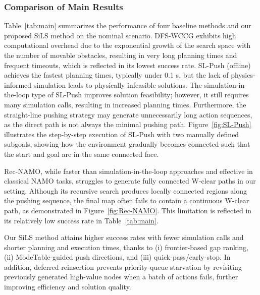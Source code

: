 \subsubsection{Comparison of Main Results}
\label{subsec:comparison}
Table~\ref{tab:main} summarizes the performance of four baseline methods and our proposed SiLS method on the nominal scenario. DFS-WCCG exhibits high computational overhead due to the exponential growth of the search space with the number of movable obstacles, resulting in very long planning times and frequent timeouts, which is reflected in its lowest success rate. SL-Push (offline) achieves the fastest planning times, typically under 0.1 s, but the lack of physics-informed simulation leads to physically infeasible solutions. The simulation-in-the-loop type of SL-Push improves solution feasibility; however, it still requires many simulation calls, resulting in increased planning times. Furthermore, the straight-line pushing strategy may generate unnecessarily long action sequences, as the direct path is not always the minimal pushing path. Figure~\ref{fig:SL-Push} illustrates the step-by-step execution of SL-Push with two manually defined subgoals, showing how the environment gradually becomes connected such that the start and goal are in the same connected face.

Rec-NAMO, while faster than simulation-in-the-loop approaches and effective in classical NAMO tasks, struggles to generate fully connected W-clear paths in our setting. Although its recursive search produces locally connected regions along the pushing sequence, the final map often fails to contain a continuous W-clear path, as demonstrated in Figure~\ref{fig:Rec-NAMO}. This limitation is reflected in its relatively low success rate in Table~\ref{tab:main}.

Our SiLS method attains higher success rates with fewer simulation calls and shorter planning and execution times, thanks to (i) frontier-based gap ranking, (ii) ModeTable-guided push directions, and (iii) quick-pass/early-stop. In addition, deferred reinsertion prevents priority-queue starvation by revisiting previously generated high-value nodes when a batch of actions fails, further improving efficiency and solution quality.


